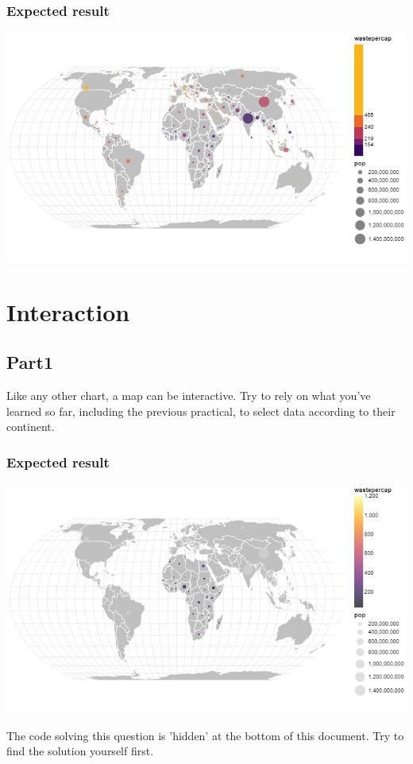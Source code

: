 \documentclass[11pt]{article}
\begin{document}
\subsubsection*{Expected result}

\begin{center}
\includegraphics[width=.6\textwidth]{visualization (7).png}
\end{center}

\section{Interaction}

\subsection*{Part1}

Like any other chart, a map can be interactive. Try to rely on what you've learned so far, including the previous practical, to select data according to their continent.

\subsubsection*{Expected result}

\begin{center}
\includegraphics[width=.6\textwidth]{visualization (8).png}
\end{center}

The code solving this question is 'hidden' at the bottom of this document. Try to find the solution yourself first.
\end{document}
